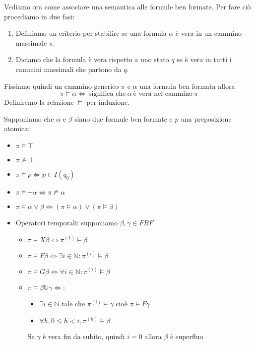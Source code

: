 Vediamo ora come associare una semantica alle formule ben formate. Per fare ciò
procediamo in due fasi:
\begin{enumerate}
    \item Definiamo un criterio per stabilire se una formula $\alpha$ è vera in
          un cammino massimale $\pi$.
    \item Diciamo che la formula è vera rispetto a uno stato $q$ se è vera in
          tutti i cammini massimali che partono da $q$.
\end{enumerate}
Fissiamo quindi un cammino generico $\pi$ e $\alpha$ una formula ben formata allora
\begin{equation}
    \pi \vDash \alpha \iff \ \text{significa che} \ \alpha \ \text{è vera nel cammino}
    \ \pi
\end{equation}
Definiremo la relazione $\vDash$ per induzione.
\begin{definizione}
    Supponiamo che $\alpha$ e $\beta$
    siano due formule ben formate e $p$ una preposizione atomica:
    \begin{itemize}
        \item $\pi \vDash \top$
        \item $\pi \not\vDash \bot$
        \item $\pi \vDash p \iff p\in I(q_0)$
        \item $\pi \vDash \lnot \alpha \iff \pi \not\vDash \alpha$
        \item $\pi \vDash  \alpha \lor \beta \iff (\pi \vDash \alpha)\lor (\pi \vDash
                  \beta) $
        \item Operatori temporali: supponiamo $\beta, \gamma \in FBF$
              \begin{itemize}
                  \item $\pi\vDash X\beta \iff \pi^{(1)}\vDash \beta$
                  \item $\pi\vDash F\beta \iff \exists i \in \mathbb{N}:\pi^{(i)}
                            \vDash \beta$
                  \item $\pi\vDash G\beta \iff \forall i \in \mathbb{N}:\pi^{(i)}
                            \vDash \beta$
                  \item $\pi \vDash \beta \mathbb{U} \gamma \iff$:
                        \begin{itemize}
                            \item $\exists i \in \mathbb{N}$ tale che $\pi^{(i)}\vDash
                                      \gamma$ cioè $\pi\vDash F\gamma$
                            \item $\forall h, 0\le h < i, \pi^{(h)}\vDash \beta$
                        \end{itemize}
                        Se $\gamma$ è vera fin da subito, quindi $i=0$ allora $\beta$
                        è superfluo
              \end{itemize}
    \end{itemize}
\end{definizione}
